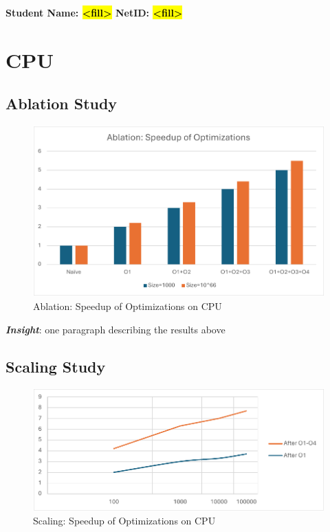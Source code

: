 \documentclass[10pt]{article}
\begin{document}
\vspace*{-0.2in}

\begin{center}
\bf Student Name: \hl{<fill>} \hspace{3mm} NetID: \hl{<fill>}
\end{center}

\normalsize

\section{CPU}

\subsection{Ablation Study}

\begin{figure}[h]
\centering
\includegraphics[width=0.7\linewidth]{assets/ablation_cpu.pdf}
\caption{Ablation: Speedup of Optimizations on CPU}
\label{fig:cpu_ablation}
\end{figure}

\textbf{\textit{Insight}}: one paragraph describing the results above

\subsection{Scaling Study}

\begin{figure}[h]
\centering
\includegraphics[width=0.7\linewidth]{assets/scaling_cpu.pdf}
\caption{Scaling: Speedup of Optimizations on CPU}
\label{fig:cpu_scaling}
\end{figure}
\end{document}
